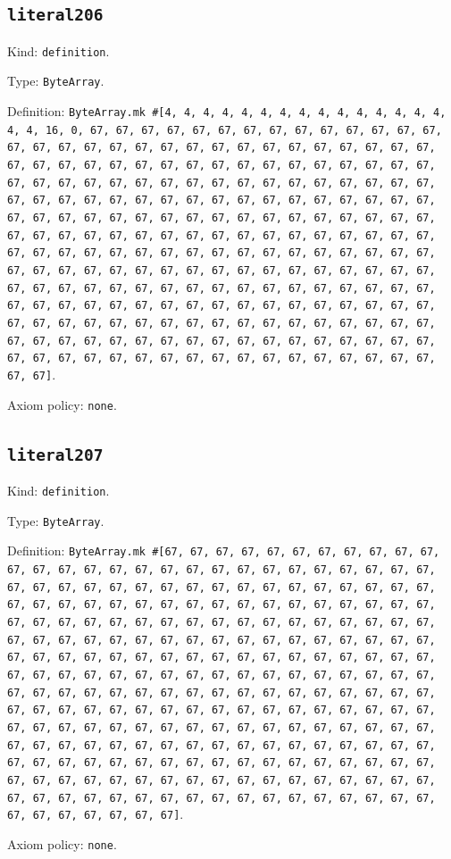 \documentclass[11pt]{article}
\begin{document}
\subsection*{\texttt{literal206}}
\noindent Kind: \texttt{definition}.\par
\noindent Type: \texttt{ByteArray}.\par
\noindent Definition: \texttt{ByteArray.mk \#[4, 4, 4, 4, 4, 4, 4, 4, 4, 4, 4, 4, 4, 4, 4, 4, 4, 16, 0, 67, 67, 67, 67, 67, 67, 67, 67, 67, 67, 67, 67, 67, 67, 67, 67, 67, 67, 67, 67, 67, 67, 67, 67, 67, 67, 67, 67, 67, 67, 67, 67, 67, 67, 67, 67, 67, 67, 67, 67, 67, 67, 67, 67, 67, 67, 67, 67, 67, 67, 67, 67, 67, 67, 67, 67, 67, 67, 67, 67, 67, 67, 67, 67, 67, 67, 67, 67, 67, 67, 67, 67, 67, 67, 67, 67, 67, 67, 67, 67, 67, 67, 67, 67, 67, 67, 67, 67, 67, 67, 67, 67, 67, 67, 67, 67, 67, 67, 67, 67, 67, 67, 67, 67, 67, 67, 67, 67, 67, 67, 67, 67, 67, 67, 67, 67, 67, 67, 67, 67, 67, 67, 67, 67, 67, 67, 67, 67, 67, 67, 67, 67, 67, 67, 67, 67, 67, 67, 67, 67, 67, 67, 67, 67, 67, 67, 67, 67, 67, 67, 67, 67, 67, 67, 67, 67, 67, 67, 67, 67, 67, 67, 67, 67, 67, 67, 67, 67, 67, 67, 67, 67, 67, 67, 67, 67, 67, 67, 67, 67, 67, 67, 67, 67, 67, 67, 67, 67, 67, 67, 67, 67, 67, 67, 67, 67, 67, 67, 67, 67, 67, 67, 67, 67, 67, 67, 67, 67, 67, 67, 67, 67, 67, 67, 67, 67, 67, 67, 67, 67, 67, 67, 67, 67, 67, 67, 67, 67, 67, 67, 67, 67, 67, 67, 67, 67, 67]}.\par
\noindent Axiom policy: \texttt{none}.\par
\subsection*{\texttt{literal207}}
\noindent Kind: \texttt{definition}.\par
\noindent Type: \texttt{ByteArray}.\par
\noindent Definition: \texttt{ByteArray.mk \#[67, 67, 67, 67, 67, 67, 67, 67, 67, 67, 67, 67, 67, 67, 67, 67, 67, 67, 67, 67, 67, 67, 67, 67, 67, 67, 67, 67, 67, 67, 67, 67, 67, 67, 67, 67, 67, 67, 67, 67, 67, 67, 67, 67, 67, 67, 67, 67, 67, 67, 67, 67, 67, 67, 67, 67, 67, 67, 67, 67, 67, 67, 67, 67, 67, 67, 67, 67, 67, 67, 67, 67, 67, 67, 67, 67, 67, 67, 67, 67, 67, 67, 67, 67, 67, 67, 67, 67, 67, 67, 67, 67, 67, 67, 67, 67, 67, 67, 67, 67, 67, 67, 67, 67, 67, 67, 67, 67, 67, 67, 67, 67, 67, 67, 67, 67, 67, 67, 67, 67, 67, 67, 67, 67, 67, 67, 67, 67, 67, 67, 67, 67, 67, 67, 67, 67, 67, 67, 67, 67, 67, 67, 67, 67, 67, 67, 67, 67, 67, 67, 67, 67, 67, 67, 67, 67, 67, 67, 67, 67, 67, 67, 67, 67, 67, 67, 67, 67, 67, 67, 67, 67, 67, 67, 67, 67, 67, 67, 67, 67, 67, 67, 67, 67, 67, 67, 67, 67, 67, 67, 67, 67, 67, 67, 67, 67, 67, 67, 67, 67, 67, 67, 67, 67, 67, 67, 67, 67, 67, 67, 67, 67, 67, 67, 67, 67, 67, 67, 67, 67, 67, 67, 67, 67, 67, 67, 67, 67, 67, 67, 67, 67, 67, 67, 67, 67, 67, 67, 67, 67, 67, 67, 67, 67, 67, 67, 67, 67, 67, 67, 67, 67, 67, 67, 67, 67]}.\par
\noindent Axiom policy: \texttt{none}.\par
\end{document}
